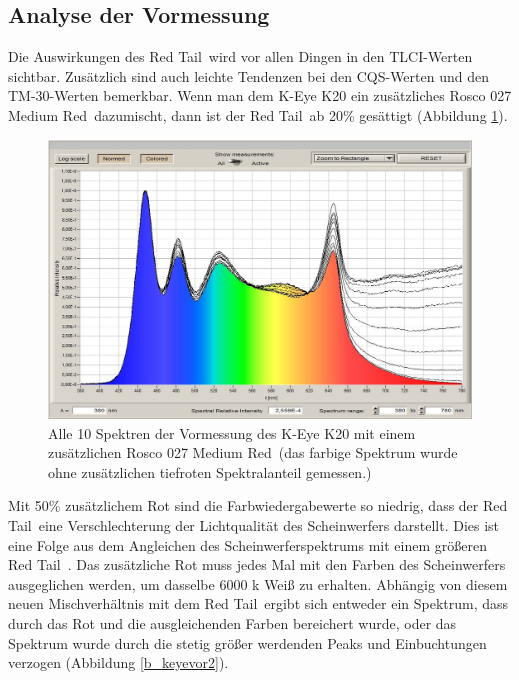 \newpage
\subsection{Analyse der Vormessung}
Die Auswirkungen des \glqq Red Tail\grqq\ wird vor allen Dingen in den TLCI-Werten sichtbar. Zusätzlich sind auch leichte Tendenzen bei den CQS-Werten und den TM-30-Werten bemerkbar.
Wenn man dem K-Eye K20 ein zusätzliches Rosco 027 \glqq Medium Red\grqq\ dazumischt, dann ist der \glqq Red Tail\grqq\ ab 20\% gesättigt (Abbildung \ref{b_keyevor1}). 

\begin{figure}[H]     %
\centering
\includegraphics[width=1.0\textwidth]{bilder/keyevor1} 
\caption {Alle 10 Spektren der Vormessung des K-Eye K20 mit einem zusätzlichen  Rosco 027 \glqq Medium Red\grqq\ (das farbige Spektrum wurde ohne zusätzlichen tiefroten Spektralanteil gemessen.)}\label{b_keyevor1}
\end{figure}
\newpage
\noindent Mit 50\% zusätzlichem Rot sind die Farbwiedergabewerte so niedrig, dass der \glqq Red Tail\grqq\ eine Verschlechterung der Lichtqualität des Scheinwerfers darstellt. Dies ist eine Folge aus dem Angleichen des Scheinwerferspektrums mit einem größeren \glqq Red Tail\grqq\ .
Das zusätzliche Rot muss jedes Mal mit den Farben des Scheinwerfers ausgeglichen werden, um dasselbe 6000 k Weiß zu erhalten. Abhängig von diesem neuen Mischverhältnis mit dem \glqq Red Tail\grqq\ ergibt sich entweder ein Spektrum, dass durch das Rot und die ausgleichenden Farben bereichert wurde, oder das Spektrum wurde durch die stetig größer werdenden Peaks und Einbuchtungen verzogen (Abbildung \ref{b_keyevor2}).


